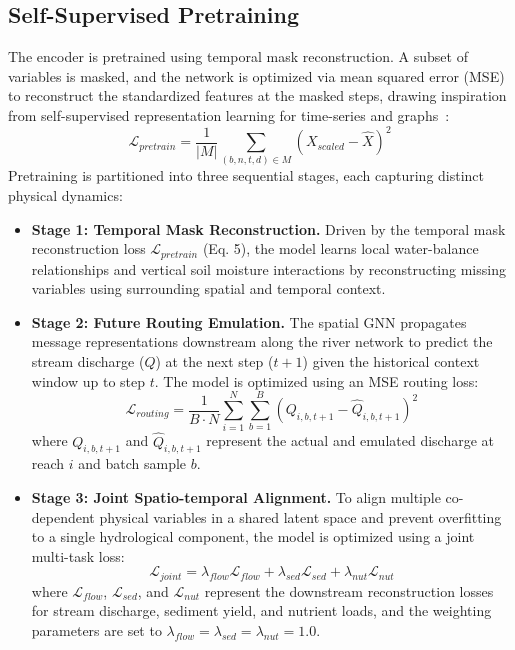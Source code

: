 \documentclass[preprint,12pt]{elsarticle}
\begin{document}
\subsection{Self-Supervised Pretraining}
The encoder is pretrained using temporal mask reconstruction. A subset of variables is masked, and the network is optimized via mean squared error (MSE) to reconstruct the standardized features at the masked steps, drawing inspiration from self-supervised representation learning for time-series and graphs~\citep{devlin2018bert, he2022masked, grill2020bootstrap, chen2020simple, hu2020strategies, rong2020self, you2020graph, yue2022ts2vec, tonekaboni2021unsupervised}:
\begin{equation}
\mathcal{L}_{pretrain} = \frac{1}{|M|} \sum_{(b, n, t, d) \in M} {(X_{scaled} - \hat{X})}^2
\end{equation}
Pretraining is partitioned into three sequential stages, each capturing distinct physical dynamics:
\begin{itemize}
    \item \textbf{Stage 1: Temporal Mask Reconstruction.} Driven by the temporal mask reconstruction loss $\mathcal{L}_{pretrain}$ (Eq. 5), the model learns local water-balance relationships and vertical soil moisture interactions by reconstructing missing variables using surrounding spatial and temporal context.
    \item \textbf{Stage 2: Future Routing Emulation.} The spatial GNN propagates message representations downstream along the river network to predict the stream discharge ($Q$) at the next step ($t+1$) given the historical context window up to step $t$. The model is optimized using an MSE routing loss:
    \begin{equation}
        \mathcal{L}_{routing} = \frac{1}{B \cdot N} \sum_{i=1}^N \sum_{b=1}^B (Q_{i, b, t+1} - \hat{Q}_{i, b, t+1})^2
    \end{equation}
    where $Q_{i, b, t+1}$ and $\hat{Q}_{i, b, t+1}$ represent the actual and emulated discharge at reach $i$ and batch sample $b$.
    \item \textbf{Stage 3: Joint Spatio-temporal Alignment.} To align multiple co-dependent physical variables in a shared latent space and prevent overfitting to a single hydrological component, the model is optimized using a joint multi-task loss:
    \begin{equation}
        \mathcal{L}_{joint} = \lambda_{flow} \mathcal{L}_{flow} + \lambda_{sed} \mathcal{L}_{sed} + \lambda_{nut} \mathcal{L}_{nut}
    \end{equation}
    where $\mathcal{L}_{flow}$, $\mathcal{L}_{sed}$, and $\mathcal{L}_{nut}$ represent the downstream reconstruction losses for stream discharge, sediment yield, and nutrient loads, and the weighting parameters are set to $\lambda_{flow} = \lambda_{sed} = \lambda_{nut} = 1.0$.
\end{itemize}
\end{document}
